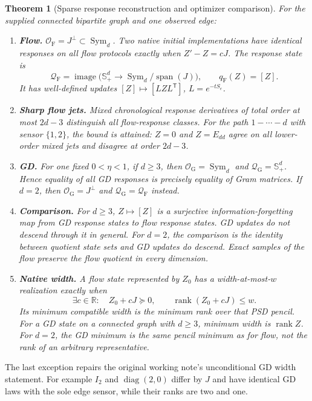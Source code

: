 \documentclass[11pt]{article}
\newtheorem{theorem}{Theorem}[section]
\theoremstyle{remark}
\newcommand{\RR}{\mathbb R}
\newcommand{\Sym}{\operatorname{Sym}}
\newcommand{\rank}{\operatorname{rank}}
\newcommand{\spanlin}{\operatorname{span}}
\newcommand{\diag}{\operatorname{diag}}
\newcommand{\PSD}{\mathbb S_+}
\newcommand{\OO}{\mathcal O}
\newcommand{\QQF}{\mathcal Q_{\mathrm F}}
\newcommand{\QQG}{\mathcal Q_{\mathrm G}}
\begin{document}
\begin{theorem}[Sparse response reconstruction and optimizer comparison]
\label{thm:learning}
For the supplied connected bipartite graph and one observed edge:
\begin{enumerate}
\item \textbf{Flow.} $\OO_{\mathrm F}=J^\perp\subset\Sym_d$. Two native initial implementations have identical responses on all flow protocols exactly when $Z'-Z=cJ$. The response state is
\[
 \QQF=\operatorname{image}\bigl(\PSD^d\longrightarrow\Sym_d/\spanlin(J)\bigr),
 \qquad q_{\mathrm F}(Z)=[Z].
\]
It has well-defined updates $[Z]\mapsto[LZL^{\mathsf T}]$, $L=e^{-tS_e}$.
\item \textbf{Sharp flow jets.} Mixed chronological response derivatives of total order at most $2d-3$ distinguish all flow-response classes. For the path $1-\cdots-d$ with sensor $\{1,2\}$, the bound is attained: $Z=0$ and $Z=E_{dd}$ agree on all lower-order mixed jets and disagree at order $2d-3$.
\item \textbf{GD.} For one fixed $0<\eta<1$, if $d\geq3$, then $\OO_{\mathrm G}=\Sym_d$ and $\QQG=\PSD^d$. Hence equality of all GD responses is precisely equality of Gram matrices. If $d=2$, then $\OO_{\mathrm G}=J^\perp$ and $\QQG=\QQF$ instead.
\item \textbf{Comparison.} For $d\geq3$, $Z\mapsto[Z]$ is a surjective information-forgetting map from GD response states to flow response states. GD updates do not descend through it in general. For $d=2$, the comparison is the identity between quotient state sets and GD updates do descend. Exact samples of the flow preserve the flow quotient in every dimension.
\item \textbf{Native width.} A flow state represented by $Z_0$ has a width-at-most-$w$ realization exactly when
\[
 \exists c\in\RR:\quad Z_0+cJ\succeq0,\qquad\rank(Z_0+cJ)\leq w.
\]
Its minimum compatible width is the minimum rank over that PSD pencil. For a GD state on a connected graph with $d\geq3$, minimum width is $\rank Z$. For $d=2$, the GD minimum is the same pencil minimum as for flow, \emph{not} the rank of an arbitrary representative.
\end{enumerate}
\end{theorem}

The last exception repairs the original working note's unconditional GD width statement. For example $I_2$ and $\diag(2,0)$ differ by $J$ and have identical GD laws with the sole edge sensor, while their ranks are two and one.
\end{document}
